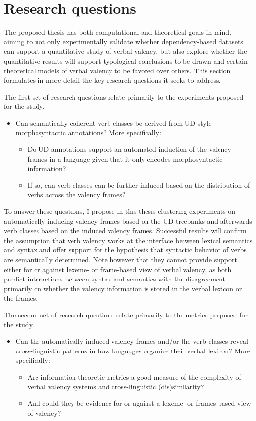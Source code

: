 \section{Research questions}\label{sec:rqs}

The proposed thesis has both computational and theoretical goals in mind, aiming to not only experimentally validate whether dependency-based datasets can support a quantitative study of verbal valency, but also explore whether the quantitative results will support typological conclusions to be drawn and certain theoretical models of verbal valency to be favored over others. This section formulates in more detail the key research questions it seeks to address.

The first set of research questions relate primarily to the experiments proposed for the study. 
\begin{itemize}
    \item Can semantically coherent verb classes be derived from UD-style morphosyntactic annotations? More specifically:
    \begin{itemize}
        \item Do UD annotations support an automated induction of the valency frames in a language given that it only encodes morphosyntactic information?
        \item If so, can verb classes can be further induced based on the distribution of verbs across the valency frames? 
    \end{itemize} 
\end{itemize}

To answer these questions, I propose in this thesis clustering experiments on automatically inducing valency frames based on the UD treebanks and afterwards verb classes based on the induced valency frames. Successful results will confirm the assumption that verb valency works at the interface between lexical semantics and syntax and offer support for the hypothesis that syntactic behavior of verbs are semantically determined. Note however that they cannot provide support either for or against lexeme- or frame-based view of verbal valency, as both predict interactions between syntax and semantics with the disagreement primarily on whether the valency information is stored in the verbal lexicon or the frames.

The second set of research questions relate primarily to the metrics proposed for the study.
\begin{itemize}
    \item Can the automatically induced valency frames and/or the verb classes reveal cross-linguistic patterns in how languages organize their verbal lexicon? More specifically:
    \begin{itemize}
        \item Are information-theoretic metrics a good measure of the complexity of verbal valency systems and cross-linguistic (dis)similarity? 
        \item And could they be evidence for or against a lexeme- or frames-based view of valency?
    \end{itemize} 
\end{itemize}

